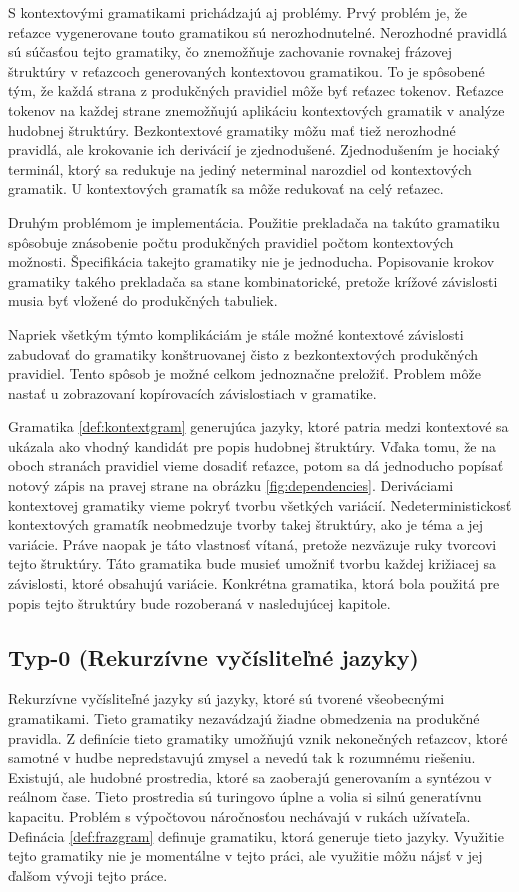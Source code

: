 S kontextovými gramatikami prichádzajú aj problémy. Prvý problém je, že reťazce vygenerovane touto gramatikou sú nerozhodnutelné. Nerozhodné pravidlá sú súčasťou tejto gramatiky, čo znemožňuje zachovanie rovnakej frázovej štruktúry v reťazcoch generovaných kontextovou gramatikou. To je spôsobené tým, že každá strana z produkčných pravidiel môže byť reťazec tokenov. Reťazce tokenov na každej strane znemožňujú aplikáciu kontextových gramatik v analýze hudobnej štruktúry. Bezkontextové gramatiky môžu mať tiež nerozhodné pravidlá, ale krokovanie ich derivácií je zjednodušené. Zjednodušením je hociaký terminál, ktorý sa redukuje na jediný neterminal narozdiel od kontextových gramatik. U kontextových gramatík sa môže redukovať na celý reťazec.

Druhým problémom je implementácia. Použitie prekladača na takúto gramatiku spôsobuje znásobenie počtu produkčných pravidiel počtom kontextových možnosti. Špecifikácia takejto gramatiky nie je jednoducha. Popisovanie krokov gramatiky takého prekladača sa stane kombinatorické, pretože krížové závislosti musia byť vložené do produkčných tabuliek.

Napriek všetkým týmto komplikáciám je stále možné kontextové závislosti zabudovať do gramatiky konštruovanej čisto z bezkontextových produkčných pravidiel. Tento spôsob je možné celkom jednoznačne preložiť. Problem môže nastať u zobrazovaní kopírovacích závislostiach v gramatike.

Gramatika \ref{def:kontextgram} generujúca jazyky, ktoré patria medzi kontextové sa ukázala ako vhodný kandidát pre popis hudobnej štruktúry. Vďaka tomu, že na oboch stranách pravidiel vieme dosadiť reťazce, potom sa dá jednoducho popísať notový zápis na pravej strane na obrázku \ref{fig:dependencies}. Deriváciami kontextovej gramatiky vieme pokryť tvorbu všetkých variácií. Nedeterministickosť kontextových gramatík neobmedzuje tvorby takej štruktúry, ako je téma a jej variácie. Práve naopak je táto vlastnosť vítaná, pretože nezväzuje ruky tvorcovi tejto štruktúry. Táto gramatika bude musieť umožniť tvorbu každej križiacej sa závislosti, ktoré obsahujú variácie. Konkrétna gramatika, ktorá bola použitá pre popis tejto štruktúry bude rozoberaná v nasledujúcej kapitole.

\subsection*{Typ-0 (Rekurzívne vyčísliteľné jazyky)}
Rekurzívne vyčísliteľné jazyky sú jazyky, ktoré sú tvorené všeobecnými gramatikami. Tieto gramatiky nezavádzajú žiadne obmedzenia na produkčné pravidla. Z definície tieto gramatiky umožňujú vznik nekonečných reťazcov, ktoré samotné v hudbe nepredstavujú zmysel a nevedú tak k rozumnému riešeniu. Existujú, ale hudobné prostredia, ktoré sa zaoberajú generovaním a syntézou v reálnom čase. Tieto prostredia sú turingovo úplne a volia si silnú generatívnu kapacitu. Problém s výpočtovou náročnosťou nechávajú v rukách užívateľa. Definácia \ref{def:frazgram} definuje gramatiku, ktorá generuje tieto jazyky. Využitie tejto gramatiky nie je momentálne v tejto práci, ale využitie môžu nájsť v jej ďalšom vývoji tejto práce.

